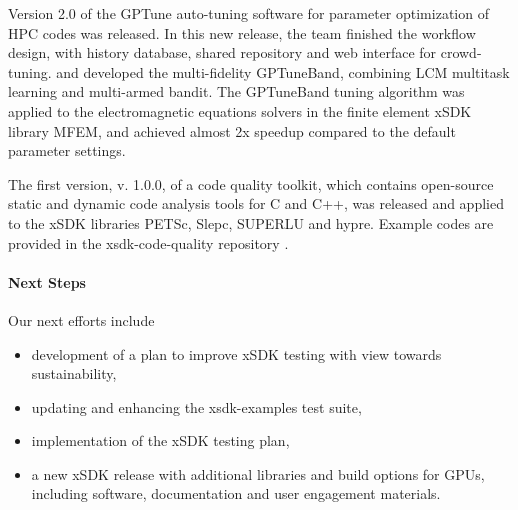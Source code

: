 Version 2.0 of the GPTune auto-tuning software for parameter optimization of HPC codes \cite{gptune:homepage} was released. In this new release, the team finished the workflow design, with history database, shared repository and web interface for crowd-tuning. and developed the multi-fidelity GPTuneBand, combining LCM multitask learning and multi-armed bandit. The  GPTuneBand tuning algorithm was applied to the electromagnetic equations solvers in the finite element xSDK library MFEM, and achieved almost 2x speedup compared to the default parameter settings. 

The first version, v. 1.0.0, of a code quality toolkit, which contains open-source static and dynamic code analysis tools for C and C++, was released and applied to the xSDK libraries PETSc, Slepc, SUPERLU and hypre. Example codes are provided in the xsdk-code-quality repository \cite{xsdk-code-quality}.

\paragraph{Next Steps}

Our next efforts include 
\begin{itemize}
    \item development of a plan to improve xSDK testing with view towards sustainability,
    \item updating and enhancing the xsdk-examples test suite,
    \item implementation of the xSDK testing plan,
   \item a new xSDK release with additional libraries and build options for GPUs, including software, documentation and user engagement materials.
\end{itemize}

\newpage

